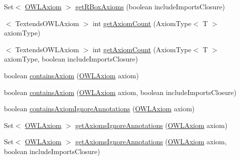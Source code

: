 \begin{DoxyCompactItemize}
\item 
Set$<$ \hyperlink{interfaceorg_1_1semanticweb_1_1owlapi_1_1model_1_1_o_w_l_axiom}{O\-W\-L\-Axiom} $>$ \hyperlink{interfaceorg_1_1semanticweb_1_1owlapi_1_1model_1_1_o_w_l_ontology_ac5c5cc418a96a3ff265f3e762da110ca}{get\-R\-Box\-Axioms} (boolean include\-Imports\-Closure)
\item 
$<$ Textends\-O\-W\-L\-Axiom $>$ int \hyperlink{interfaceorg_1_1semanticweb_1_1owlapi_1_1model_1_1_o_w_l_ontology_a4c6070a71574db6c7027985a8b774da4}{get\-Axiom\-Count} (Axiom\-Type$<$ T $>$ axiom\-Type)
\item 
$<$ Textends\-O\-W\-L\-Axiom $>$ int \hyperlink{interfaceorg_1_1semanticweb_1_1owlapi_1_1model_1_1_o_w_l_ontology_ade5d836bf51a691b170325b3bc5485af}{get\-Axiom\-Count} (Axiom\-Type$<$ T $>$ axiom\-Type, boolean include\-Imports\-Closure)
\item 
boolean \hyperlink{interfaceorg_1_1semanticweb_1_1owlapi_1_1model_1_1_o_w_l_ontology_ad47e92e4473bc219fd3458059d961925}{contains\-Axiom} (\hyperlink{interfaceorg_1_1semanticweb_1_1owlapi_1_1model_1_1_o_w_l_axiom}{O\-W\-L\-Axiom} axiom)
\item 
boolean \hyperlink{interfaceorg_1_1semanticweb_1_1owlapi_1_1model_1_1_o_w_l_ontology_ac4a28cc8dd81958f975835d7161c8d9c}{contains\-Axiom} (\hyperlink{interfaceorg_1_1semanticweb_1_1owlapi_1_1model_1_1_o_w_l_axiom}{O\-W\-L\-Axiom} axiom, boolean include\-Imports\-Closure)
\item 
boolean \hyperlink{interfaceorg_1_1semanticweb_1_1owlapi_1_1model_1_1_o_w_l_ontology_adda4d6ea7571709ae0e324538a02b204}{contains\-Axiom\-Ignore\-Annotations} (\hyperlink{interfaceorg_1_1semanticweb_1_1owlapi_1_1model_1_1_o_w_l_axiom}{O\-W\-L\-Axiom} axiom)
\item 
Set$<$ \hyperlink{interfaceorg_1_1semanticweb_1_1owlapi_1_1model_1_1_o_w_l_axiom}{O\-W\-L\-Axiom} $>$ \hyperlink{interfaceorg_1_1semanticweb_1_1owlapi_1_1model_1_1_o_w_l_ontology_ac34f6f2a92440af4134ba27138d2d837}{get\-Axioms\-Ignore\-Annotations} (\hyperlink{interfaceorg_1_1semanticweb_1_1owlapi_1_1model_1_1_o_w_l_axiom}{O\-W\-L\-Axiom} axiom)
\item 
Set$<$ \hyperlink{interfaceorg_1_1semanticweb_1_1owlapi_1_1model_1_1_o_w_l_axiom}{O\-W\-L\-Axiom} $>$ \hyperlink{interfaceorg_1_1semanticweb_1_1owlapi_1_1model_1_1_o_w_l_ontology_ab9691729310ece9d6605e79a2b925df6}{get\-Axioms\-Ignore\-Annotations} (\hyperlink{interfaceorg_1_1semanticweb_1_1owlapi_1_1model_1_1_o_w_l_axiom}{O\-W\-L\-Axiom} axiom, boolean include\-Imports\-Closure)
\item 

\end{DoxyCompactItemize}
